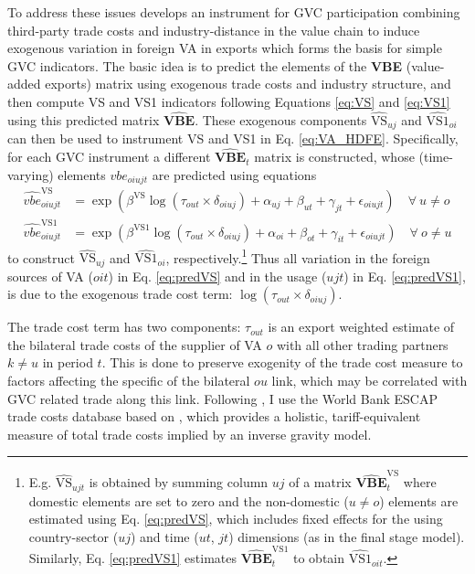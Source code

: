 \documentclass[a4paper]{article}
\begin{document}
To address these issues \citet{Kummritz20161} develops an instrument for GVC participation combining third-party trade costs and industry-distance in the value chain to induce exogenous variation in foreign VA in exports which forms the basis for simple GVC indicators. The basic idea is to predict the elements of the \textbf{VBE} (value-added exports) matrix using exogenous trade costs and industry structure, and then compute VS and VS1 indicators following Equations \ref{eq:VS} and \ref{eq:VS1} using this predicted matrix $\hat{\textbf{VBE}}$. These exogenous components $\hat{\text{VS}}_{uj}$ and $\hat{\text{VS1}}_{oi}$ can then be used to instrument VS and VS1 in Eq. \ref{eq:VA_HDFE}. Specifically, for each GVC instrument a different $\hat{\textbf{VBE}}_t$ matrix is constructed, whose (time-varying) elements $vbe_{oiujt}$ are predicted using equations
\begin{align} \label{eq:predVS}
\hat{vbe}_{oiujt}^\text{VS} &= \exp(\beta^\text{VS} \log(\tau_{out}\times \delta_{oiuj}) + \alpha_{uj} + \beta_{ut} +\gamma_{jt} + \epsilon_{oiujt}) \quad \forall\  u\neq o \\ \label{eq:predVS1}
\hat{vbe}_{oiujt}^\text{VS1} &= \exp(\beta^\text{VS1} \log(\tau_{out}\times \delta_{oiuj}) + \alpha_{oi} + \beta_{ot} +\gamma_{it} + \epsilon_{oiujt}) \quad \forall\  o\neq u
\end{align}
to construct $\hat{\text{VS}}_{uj}$ and $\hat{\text{VS1}}_{oi}$, respectively.\footnote{E.g. $\hat{\text{VS}}_{ujt}$ is obtained by summing column $uj$ of a matrix $\hat{\textbf{VBE}}_t^\text{VS}$ where domestic elements are set to zero and the non-domestic ($u\neq o$) elements are estimated using Eq. \ref{eq:predVS}, which includes fixed effects for the using country-sector ($uj$) and time ($ut$, $jt$) dimensions (as in the final stage model). Similarly, Eq. \ref{eq:predVS1} estimates $\hat{\textbf{VBE}}_t^\text{VS1}$ to obtain $\hat{\text{VS1}}_{oit}$. \vspace{-5mm} } Thus all variation in the foreign sources of VA ($oit$) in Eq. \ref{eq:predVS} and in the usage ($ujt$) in Eq. \ref{eq:predVS1}, is due to the exogenous trade cost term: $\log(\tau_{out}\times \delta_{oiuj})$. \newline

The trade cost term has two components: $\tau_{out}$ is an export weighted estimate of the bilateral trade costs of the supplier of VA $o$ with all other trading partners $k\neq u$ in period $t$. This is done to preserve exogenity of the trade cost measure to factors affecting the specific of the bilateral $ou$ link, which may be correlated with GVC related trade along this link. Following \citet{Kummritz20161}, I use the World Bank ESCAP trade costs database \citep{arvis2016trade} based on \citet{novy2013gravity}, which provides a holistic, tariff-equivalent measure of total trade costs implied by an inverse gravity model. \newline %
\end{document}
